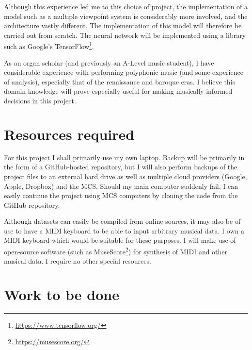 \documentclass[12pt,a4paper,twoside]{article}
\begin{document}
Although this experience led me to this choice of project, the implementation of
a model such as a multiple viewpoint system is considerably more involved, and
the architecture vastly different. The implementation of this model will
therefore be carried out from scratch.  The neural network will be implemented
using a library such as Google's
TensorFlow\footnote{\url{https://www.tensorflow.org/}}.

As an organ scholar (and previously an A-Level music student), I have
considerable experience with performing polyphonic music (and some experience of
analysis), especially that of the renaissance and baroque eras. I believe this
domain knowledge will prove especially useful for making musically-informed
decisions in this project. 

\section*{Resources required}

For this project I shall primarily use my own laptop. Backup will be primarily
in the form of a GitHub-hosted repository, but I will also perform backups of
the project files to an external hard drive as well as multiple cloud providers
(Google, Apple, Dropbox) and the MCS. Should my main computer suddenly fail, I
can easily continue the project using MCS computers by cloning the code from the
GitHub repository.

Although datasets can easily be compiled from online sources, it may also be of
use to have a MIDI keyboard to be able to input arbitrary musical data. I own a
MIDI keyboard which would be suitable for these purposes. I will make use of
open-source software (such as MuseScore\footnote{\url{https://musescore.org/}})
for synthesis of MIDI and other musical data. I require no other special
resources.

\section*{Work to be done}
\end{document}
